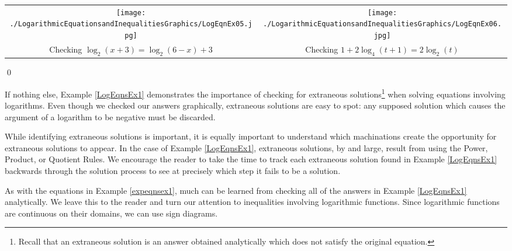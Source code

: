 \documentclass{ximera}
\begin{document}
\begin{example}
\begin{enumerate}
\begin{center}
\begin{tabular}{cc}

\texttt{[image: ./LogarithmicEquationsandInequalitiesGraphics/LogEqnEx05.jpg]} &

\texttt{[image: ./LogarithmicEquationsandInequalitiesGraphics/LogEqnEx06.jpg]}  \\

Checking $\log_{2}(x+3) = \log_{2}(6-x)+3$
 
 &
 
 Checking $1 + 2 \log_{4}(t+1) = 2 \log_{2}(t)$
 
\end{tabular}

\end{center}
\end{enumerate}

\qed
\end{example}

If nothing else,  Example \ref{LogEqnsEx1} demonstrates the importance of checking for extraneous solutions\footnote{Recall that an extraneous solution is an answer obtained analytically which does not satisfy the original equation.} when solving equations involving logarithms.  Even though we checked our answers graphically, extraneous solutions are easy to spot:  any supposed solution which causes the argument of a logarithm to be negative must be discarded.  

\smallskip

While identifying extraneous solutions is important, it is equally important to understand which machinations create the opportunity for extraneous solutions to appear.  In the case of Example \ref{LogEqnsEx1}, extraneous solutions, by and large, result from using the Power, Product, or Quotient Rules.  We encourage the reader to take the time to track each extraneous solution found in  Example \ref{LogEqnsEx1}  backwards through the solution process to see at precisely which step it fails to be a solution.

\smallskip

As with the equations in Example \ref{expeqnsex1}, much can be learned from checking all of the answers in Example \ref{LogEqnsEx1} analytically.  We leave this to the reader and turn our attention to inequalities involving logarithmic functions.  Since logarithmic functions are continuous on their domains, we can use sign diagrams.  

\smallskip
\end{document}
